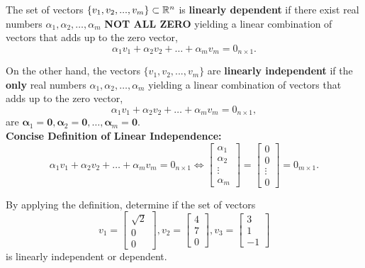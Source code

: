 \begin{tcolorbox}[sharp corners, colback=green!30, colframe=green!80!blue, title=\textbf{Linear Independence of a Set of Vectors}]
 The set of vectors $\{v_1, v_2, ..., v_m \} \subset \mathbb R^n$ is \textbf{linearly dependent} if there exist real numbers $\alpha_1, \alpha_2, \ldots, \alpha_m$ \textbf{NOT ALL ZERO} yielding a linear combination of vectors that adds up to the zero vector,
\begin{equation}
    \alpha_1 v_1 + \alpha_2 v_2 + \ldots + \alpha_m v_m =0_{n \times 1}.
\end{equation}

On the other hand, the vectors $\{v_1, v_2, ..., v_m \}$ are \textbf{linearly independent} if the \textbf{only} real numbers $\alpha_1, \alpha_2, \ldots, \alpha_m$ yielding a linear combination of vectors that adds up to the zero vector,
\begin{equation}
    \alpha_1 v_1 + \alpha_2 v_2 + \ldots + \alpha_m v_m =0_{n \times 1},
    \end{equation}
are $\boldsymbol{\alpha}_1= \mathbf{0}, \boldsymbol{\alpha}_2=\mathbf{0}, \ldots, \boldsymbol{\alpha}_m=\mathbf{0}.$\\

\textbf{Concise Definition of Linear Independence:} 
$$\alpha_1 v_1 + \alpha_2 v_2 + \ldots + \alpha_m v_m =0_{n \times 1}  \iff \begin{bmatrix} \alpha_1 \\ \alpha_2 \\ \vdots \\ \alpha_m \end{bmatrix} = \begin{bmatrix} 0 \\ 0 \\ \vdots \\ 0 \end{bmatrix}= 0_{m \times 1}.$$
\end{tcolorbox}

\vspace*{.5cm}
\begin{example} 
\label{ex:LinearIndep02} By applying the definition, determine if the set of vectors
$$v_1 = \left[ \begin{array}{r} \sqrt{2} \\0\\  0  \end{array} \right]  , v_2 = \left[ \begin{array}{r}  4 \\ 7  \\0  \end{array} \right], v_3 = \left[ \begin{array}{r} 3 \\ 1 \\ -1   \end{array} \right] $$
is linearly independent or dependent.
\end{example}

